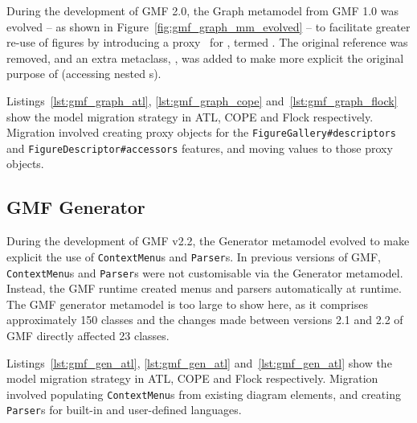During the development of GMF 2.0, the Graph metamodel from GMF 1.0 was evolved -- as shown in Figure~\ref{fig:gmf_graph_mm_evolved} -- to facilitate greater re-use of figures by introducing a proxy~\cite{gamma95patterns} for , termed . The original  reference was removed, and an extra metaclass, , was added to make more explicit the original purpose of  (accessing nested s).


Listings~\ref{lst:gmf_graph_atl}, \ref{lst:gmf_graph_cope} and~\ref{lst:gmf_graph_flock} show the model migration strategy in ATL, COPE and Flock respectively. Migration involved creating proxy objects for the \texttt{Fi\-gu\-reG\-al\-le\-ry\#de\-sc\-ri\-pt\-ors} and \texttt{Fi\-gu\-reDe\-sc\-ri\-pt\-or\#ac\-ce\-ss\-ors} features, and moving values to those proxy objects.



\subsection{GMF Generator}
During the development of GMF v2.2, the Generator metamodel evolved to make explicit the use of \texttt{Co\-nt\-e\-xtMe\-nu}s and \texttt{Pa\-rs\-er}s. In previous versions of GMF, \texttt{Co\-nt\-e\-xtMe\-nu}s and \texttt{Pa\-rs\-er}s were not customisable via the Generator metamodel. Instead, the GMF runtime created menus and parsers automatically at runtime. The GMF generator metamodel is too large to show here, as it comprises approximately 150 classes and the changes made between versions 2.1 and 2.2 of GMF directly affected 23 classes.

Listings~\ref{lst:gmf_gen_atl}, \ref{lst:gmf_gen_atl} and~\ref{lst:gmf_gen_atl} show the model migration strategy in ATL, COPE and Flock respectively. Migration involved populating \texttt{Co\-nt\-e\-xtMe\-nu}s from existing diagram elements, and creating \texttt{Pa\-rs\-er}s for built-in and user-defined languages.

